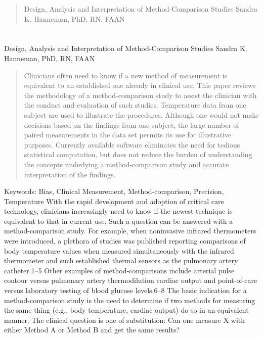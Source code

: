 \documentclass[]{article}
\begin{document}
\begin{abstract}
Design, Analysis and Interpretation of Method-Comparison Studies
Sandra K. Hanneman, PhD, RN, FAAN
\end{abstract}

\section{}
Design, Analysis and Interpretation of Method-Comparison Studies
Sandra K. Hanneman, PhD, RN, FAAN

\begin{abstract}
Clinicians often need to know if a new method of measurement is equivalent to an established one already in clinical use. This paper reviews the methodology of a method-comparison study to assist the clinician with the conduct and evaluation of such studies. Temperature data from one subject are used to illustrate the procedures. Although one would not make decisions based on the findings from one subject, the large number of paired measurements in the data set permits its use for illustrative purposes. Currently available software eliminates the need for tedious statistical computation, but does not reduce the burden of understanding the concepts underlying a method-comparison study and accurate interpretation of the findings.
\end{abstract}

Keywords: Bias, Clinical Measurement, Method-comparison, Precision, Temperature
With the rapid development and adoption of critical care technology, clinicians increasingly need to know if the newest technique is equivalent to that in current use. Such a question can be answered with a method-comparison study. For example, when noninvasive infrared thermometers were introduced, a plethora of studies was published reporting comparisons of body temperature values when measured simultaneously with the infrared thermometer and such established thermal sensors as the pulmonary artery catheter.1–5 Other examples of method-comparisons include arterial pulse contour versus pulmonary artery thermodilution cardiac output and point-of-care versus laboratory testing of blood glucose levels.6–8 The basic indication for a method-comparison study is the need to determine if two methods for measuring the same thing (e.g., body temperature, cardiac output) do so in an equivalent manner. The clinical question is one of substitution: Can one measure X with either Method A or Method B and get the same results?
\end{document}
